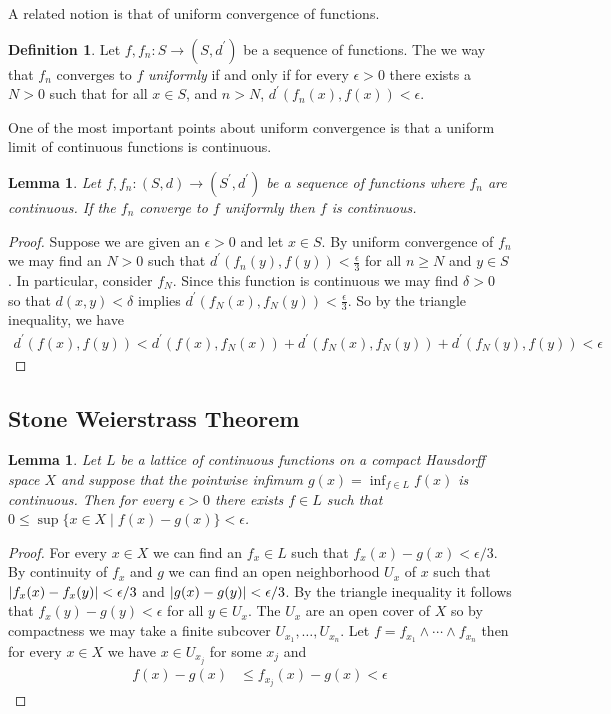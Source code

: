 \documentclass{amsart}
\newtheorem{lem}[thm]{Lemma}
\theoremstyle{remark}
\theoremstyle{definition}
\newtheorem{defn}[thm]{Definition}
\begin{document}
A related notion is that of uniform convergence of functions.
\begin{defn}Let $f, f_n : S \to (S, d^\prime)$ be a sequence
  of functions.  The we way that $f_n$ converges to $f$
  \emph{uniformly} if and only if for every $\epsilon > 0$ there
  exists a $N > 0$ such that for all $x \in S$, and $n > N$, $d^\prime(f_n(x), f(x)) < \epsilon$.
\end{defn}

One of the most important points about uniform convergence is that a
uniform limit of continuous functions is continuous.
\begin{lem}\label{UniformLimitContinuousFunctionsIsContinuous}Let $f,
  f_n : (S,d) \to (S^\prime, d^\prime)$ be a sequence
  of functions where $f_n$ are continuous.  If the $f_n$ converge
  to $f$ uniformly then $f$ is continuous.
\end{lem}
\begin{proof}
Suppose we are given an $\epsilon > 0$ and let $x \in S$.  By uniform
convergence of $f_n$ we may find an $N > 0$ such that
$d^\prime(f_n(y), f(y)) < \frac{\epsilon}{3}$ for all $n \geq N$ and
$y \in S$.  In particular, consider $f_N$.  Since this function is
continuous we may find $\delta > 0$ so that $d(x,y) < \delta$ implies
$d^\prime(f_N(x), f_N(y)) < \frac{\epsilon}{3}$.  So by the triangle
inequality, we have 
\begin{align*}
d^\prime(f(x), f(y)) < d^\prime(f(x), f_N(x)) + d^\prime(f_N(x),
f_N(y)) + d^\prime(f_N(y), f(y)) < \epsilon
\end{align*}
\end{proof}

\subsection{Stone Weierstrass Theorem}

\begin{lem}\label{ApproximationOfLatticeInfimum}Let $L$ be a lattice of continuous functions on a compact Hausdorff
  space $X$ and suppose that the pointwise infimum $g(x) = \inf_{f \in
    L} f(x)$ is continuous.  Then for every $\epsilon > 0$ there
  exists $f \in L$ such that $0 \leq \sup \lbrace x \in X \mid f(x) - g(x)
  \rbrace < \epsilon$.
\end{lem}
\begin{proof}
For every $x \in X$ we can find an $f_x \in L$ such that $f_x(x) - g(x) <
\epsilon/3$.  By continuity of $f_x$ and $g$ we can find an open
neighborhood  $U_x$ of $x$ such that $\left \vert f_x(x) - f_x(y) \right \vert < \epsilon/3$
and $\left \vert g(x) - g(y) \right \vert < \epsilon/3$.  By the triangle inequality it
follows that $f_x(y) - g(y) < \epsilon$ for all $y \in U_x$.  The
$U_x$ are an open cover of $X$ so by compactness we may take a finite
subcover $U_{x_1}, \dotsc, U_{x_n}$.  Let $f = f_{x_1} \wedge \cdots
\wedge f_{x_n}$ then for every $x \in X$ we have $x \in U_{x_j}$ for
some $x_j$ and 
\begin{align*}
f(x) - g(x) &\leq f_{x_j}(x) - g(x) < \epsilon
\end{align*}
\end{proof}
\end{document}

